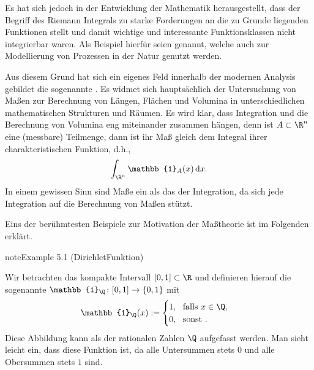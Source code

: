\documentclass[letterpaper,10pt,english]{jupyterBook}
\begin{document}
\sphinxAtStartPar
Es hat sich jedoch in der Entwicklung der Mathematik herausgestellt, dass der Begriff des Riemann Integrals zu starke Forderungen an die zu Grunde liegenden Funktionen stellt und damit wichtige und interessante Funktionsklassen nicht integrierbar waren.
Als Beispiel hierfür seien  genannt, welche auch zur Modellierung von Prozessen in der Natur genutzt werden.

\sphinxAtStartPar
Aus diesem Grund hat sich ein eigenes Feld innerhalb der modernen Analysis gebildet \sphinxhyphen{} die sogenannte .
Es widmet sich hauptsächlich der Untersuchung von Maßen zur Berechnung von Längen, Flächen und Volumina in unterschiedlichen mathematischen Strukturen und Räumen.
Es wird klar, dass Integration und die Berechnung von Volumina eng miteinander zusammen hängen, denn ist \(A\subset\R^n\) eine (messbare) Teilmenge, dann ist ihr Maß gleich dem Integral ihrer charakteristischen Funktion, d.h.,
\begin{equation*}
\begin{split}\int_{\R^n} \mathbb{1}_A(x)\,\mathrm{d}x.\end{split}
\end{equation*}
\sphinxAtStartPar
In einem gewissen Sinn sind Maße ein  als das der Integration, da sich jede Integration auf die Berechnung von Maßen stützt.

\sphinxAtStartPar
Eins der berühmtesten Beispiele zur Motivation der Maßtheorie ist im Folgenden erklärt.
\label{masstheorie/intro_masstheorie:ex:dirichletFunktion}
\begin{sphinxadmonition}{note}{Example 5.1 (Dirichlet\sphinxhyphen{}Funktion)}



\sphinxAtStartPar
Wir betrachten das kompakte Intervall \([0,1] \subset \R\) und definieren hierauf die sogenannte  \(\mathbb{1}_\Q \colon [0,1] \rightarrow \{0,1\}\) mit
\begin{equation*}
\begin{split}\mathbb{1}_\Q(x) := \begin{cases} 1, \ \text{ falls } x \in \Q, \\ 0, \ \text{ sonst }.\end{cases}\end{split}
\end{equation*}
\sphinxAtStartPar
Diese Abbildung kann als  der rationalen Zahlen \(\Q\) aufgefasst werden.
Man sieht leicht ein, dass diese Funktion  ist, da alle Untersummen stets \(0\) und alle Obersummen stets \(1\) sind.
\end{sphinxadmonition}
\end{document}
